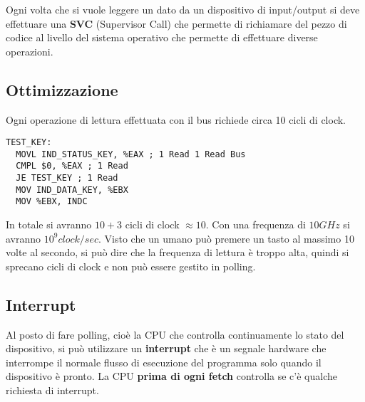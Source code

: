 \documentclass[a4paper]{article}
\theoremstyle{break}
\theoremstyle{break}
\theoremstyle{break}
\theoremstyle{break}
\begin{document}
\vspace{1em}
\noindent Ogni volta che si vuole leggere un dato da un dispositivo di input/output si deve
effettuare una \textbf{SVC} (Supervisor Call) che permette di richiamare del pezzo
di codice al livello del sistema operativo che permette di effettuare diverse operazioni.

\subsection{Ottimizzazione}
Ogni operazione di lettura effettuata con il bus richiede circa 10 cicli di clock.
\begin{lstlisting}[language={[x86masm]Assembler}]
 TEST_KEY:
  MOVL IND_STATUS_KEY, %EAX ; 1 Read 1 Read Bus
  CMPL $0, %EAX ; 1 Read
  JE TEST_KEY ; 1 Read
  MOV IND_DATA_KEY, %EBX 
  MOV %EBX, INDC 
\end{lstlisting}
\noindent In totale si avranno \( 10 + 3 \) cicli di clock \( \approx 10 \). Con una
frequenza di \( 10GHz \) si avranno \( 10^9 clock/sec \). Visto che un umano può premere
un tasto al massimo 10 volte al secondo, si può dire che la frequenza di lettura è
troppo alta, quindi si sprecano cicli di clock e non può essere gestito in polling.

\subsection{Interrupt}
Al posto di fare polling, cioè la CPU che controlla continuamente lo stato del dispositivo,
si può utilizzare un \textbf{interrupt} che è un segnale hardware che interrompe il normale
flusso di esecuzione del programma solo quando il dispositivo è pronto. La CPU
\textbf{prima di ogni fetch} controlla se c'è qualche richiesta di interrupt.
\begin{figure}[H]
	\centering
\end{figure}
\end{document}
